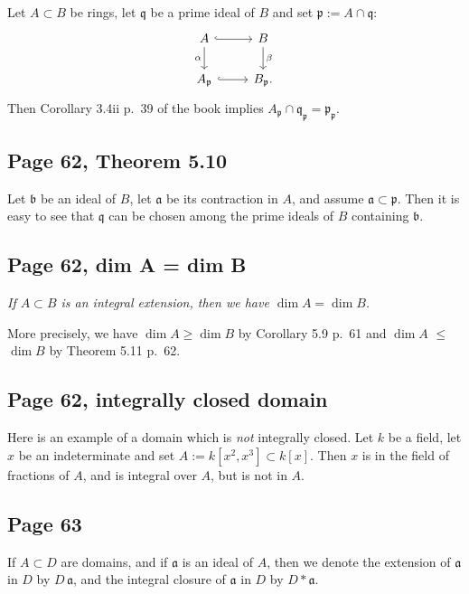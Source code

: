 \documentclass[parskip=half,fontsize=12pt]{scrartcl}%
\newcommand{\mf}{\mathfrak}
\newcommand{\ppp}{\mf p}
\begin{document}
Let $A\subset B$ be rings, let $\mf q$ be a prime ideal of $B$ and set $\ppp:=A\cap\mf q$:
$$
\begin{tikzcd}
A\ar[d,"\alpha"']\ar[r,hook]&B\ar[d,"\beta"]\\ 
A_\ppp\ar[r,hook]&B_\ppp.
\end{tikzcd}
$$
Then Corollary 3.4ii p.~39 of the book implies $A_\ppp\cap\mf q_\ppp=\ppp_\ppp$.

\subsection{Page 62, Theorem 5.10}%

Let $\mf b$ be an ideal of $B$, let $\mf a$ be its contraction in $A$, and assume $\mf a\subset\ppp$. Then it is easy to see that $\mf q$ can be chosen among the prime ideals of $B$ containing $\mf b$.

\subsection{Page 62, dim A = dim B}%

\emph{If $A\subset B$ is an integral extension, then we have $\dim A=\dim B$.}

More precisely, we have $\dim A\ge\dim B$ by Corollary 5.9 p.~61 and $\dim A$ $\le$ $\dim B$ by Theorem 5.11 p.~62.

\subsection{Page 62, integrally closed domain}%

Here is an example of a domain which is \emph{not} integrally closed. Let $k$ be a field, let $x$ be an indeterminate and set $A:=k[x^2,x^3]\subset k[x]$. Then $x$ is in the field of fractions of $A$, and is integral over $A$, but is not in $A$.

\subsection{Page 63}%

If $A\subset D$ are domains, and if $\mf a$ is an ideal of $A$, then we denote the extension of $\mf a$ in $D$ by $D\,\mf a$, and the integral closure of $\mf a$ in $D$ by $D*\mf a$. 
\end{document}
